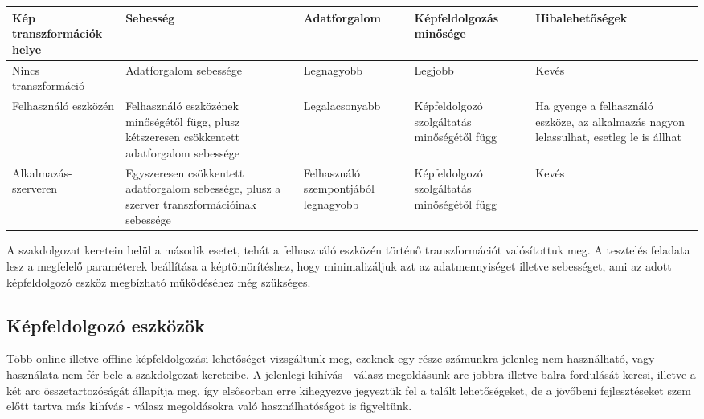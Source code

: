 \begin{center}
	\begin{tabular}{|p{2cm}|p{3cm} |p{3cm} | p{3cm}|p{3cm}|}
   	\hline
	\textbf{Kép transzformációk helye} & \textbf{Sebesség} & \textbf{Adatforgalom} & \textbf{Képfeldolgozás minősége} &\textbf{ Hibalehetőségek} \\ \hline
	Nincs transzformáció & Adatforgalom sebessége & Legnagyobb & Legjobb & Kevés \\ \hline
	Felhasználó eszközén & Felhasználó eszközének minőségétől függ, plusz kétszeresen csökkentett adatforgalom sebessége & Legalacsonyabb & Képfeldolgozó szolgáltatás minőségétől függ & Ha gyenge a felhasználó eszköze, az alkalmazás nagyon lelassulhat, esetleg le is állhat \\ \hline
	Alkalmazás-szerveren & Egyszeresen csökkentett adatforgalom sebessége, plusz a szerver transzformációinak sebessége & Felhasználó szempontjából legnagyobb & Képfeldolgozó szolgáltatás minőségétől függ & Kevés\\ \hline
	\end{tabular}
\end{center}

A szakdolgozat keretein belül a második esetet, tehát a felhasználó eszközén történő transzformációt valósítottuk meg. A tesztelés feladata lesz a megfelelő paraméterek beállítása a képtömörítéshez, hogy minimalizáljuk azt az adatmennyiséget illetve sebességet, ami az adott képfeldolgozó eszköz megbízható működéséhez még szükséges.

\subsection{Képfeldolgozó eszközök}
Több online illetve offline képfeldolgozási lehetőséget vizsgáltunk meg, ezeknek egy része számunkra jelenleg nem használható, vagy használata nem fér bele a szakdolgozat kereteibe. A jelenlegi kihívás - válasz megoldásunk arc jobbra illetve balra fordulását keresi, illetve a két arc összetartozóságát állapítja meg, így elsősorban erre kihegyezve jegyeztük fel a talált lehetőségeket, de a jövőbeni fejlesztéseket szem előtt tartva más kihívás - válasz megoldásokra való használhatóságot is figyeltünk.
